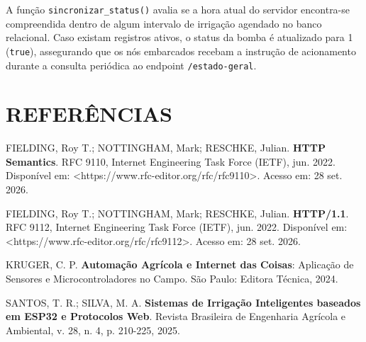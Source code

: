 A função \texttt{sincronizar\_status()} avalia se a hora atual do servidor encontra-se compreendida dentro de algum intervalo de irrigação agendado no banco relacional. Caso existam registros ativos, o status da bomba é atualizado para 1 (\texttt{true}), assegurando que os nós embarcados recebam a instrução de acionamento durante a consulta periódica ao endpoint \texttt{/estado-geral}.

\vspace{1.5em}

\section*{REFERÊNCIAS}

\begin{singlespace}
\noindent FIELDING, Roy T.; NOTTINGHAM, Mark; RESCHKE, Julian. \textbf{HTTP Semantics}. RFC 9110, Internet Engineering Task Force (IETF), jun. 2022. Disponível em: <https://www.rfc-editor.org/rfc/rfc9110>. Acesso em: 28 set. 2026.

\vspace{0.8em}
\noindent FIELDING, Roy T.; NOTTINGHAM, Mark; RESCHKE, Julian. \textbf{HTTP/1.1}. RFC 9112, Internet Engineering Task Force (IETF), jun. 2022. Disponível em: <https://www.rfc-editor.org/rfc/rfc9112>. Acesso em: 28 set. 2026.

\vspace{0.8em}
\noindent KRUGER, C. P. \textbf{Automação Agrícola e Internet das Coisas}: Aplicação de Sensores e Microcontroladores no Campo. São Paulo: Editora Técnica, 2024.

\vspace{0.8em}
\noindent SANTOS, T. R.; SILVA, M. A. \textbf{Sistemas de Irrigação Inteligentes baseados em ESP32 e Protocolos Web}. Revista Brasileira de Engenharia Agrícola e Ambiental, v. 28, n. 4, p. 210-225, 2025.
\end{singlespace}
